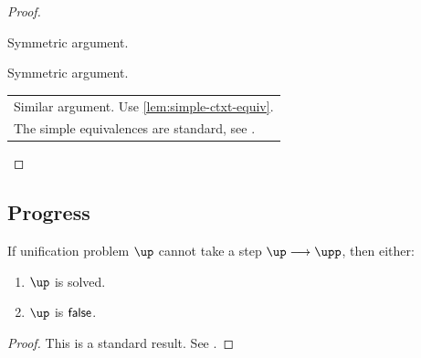 \documentclass[acmsmall,screen,nonacm%
\Anonymous{,anonymous}{}%
\Final{}{,review}%
]{acmart}
\newcommand{\BBemlti}{Pottier-Remy/emlti}
\begin{document}
\begin{proof}
\begin{proofcases}
\begin{proofcases}
\begin{proofcases}
      \proofcase{$\impliedby$}

      \begin{llproof}
	Symmetric argument.
      \end{llproof}


      \end{proofcases}



      \proofcase{$\impliedby$}

      \begin{llproof}
	Symmetric argument.
      \end{llproof}

    \end{proofcases}


  \begin{llproof}
    \begin{tabular}{l}
    Similar argument. Use \cref{lem:simple-ctxt-equiv}. \\
    The simple equivalences are standard, see \citet*{\BBemlti}.
    \end{tabular}
  \end{llproof}
  \end{proofcases}
\end{proof}

\subsection{Progress}

\begin{lemma}
  If unification problem $\up$ cannot take a step $\up \unif \upp$, then either:
  \begin{enumerate}[(\roman*)]
    \item $\up$ is solved.
    \item $\up$ is $\mathsf{false}$.
    \end{enumerate}
  \begin{proof}
    This is a standard result. See \citet*{\BBemlti}.
  \end{proof}
\end{lemma}
\end{document}
